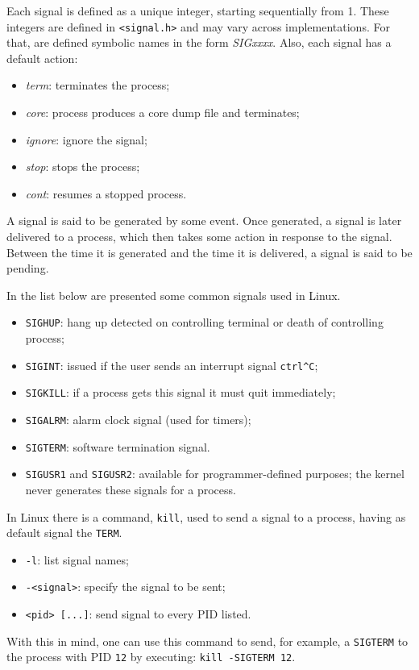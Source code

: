 Each signal is defined as a unique integer, starting sequentially from 1. These integers are defined in \verb|<signal.h>| and may vary across implementations. For that, are defined symbolic names in the form \textit{SIGxxxx}. Also, each signal has a default action:
\begin{itemize}
	\item \textit{term}: terminates the process;
	\item \textit{core}: process produces a core dump file and terminates;
	\item \textit{ignore}: ignore the signal;
	\item \textit{stop}: stops the process;
	\item \textit{cont}: resumes a stopped process.
\end{itemize}
A signal is said to be generated by some event. Once generated, a signal is later
delivered to a process, which then takes some action in response to the signal.
Between the time it is generated and the time it is delivered, a signal is said to be
pending.

In the list below are presented some common signals used in Linux.
\begin{itemize}
	\item \verb|SIGHUP|: hang up detected on controlling terminal or death of controlling process;
	\item \verb|SIGINT|: issued if the user sends an interrupt signal \verb|ctrl^C|;
	\item \verb|SIGKILL|: if a process gets this signal it must quit immediately;
	\item \verb|SIGALRM|: alarm clock signal (used for timers);
	\item \verb|SIGTERM|: software termination signal.
	\item \verb|SIGUSR1| and \verb|SIGUSR2|: available for programmer-defined purposes; the kernel never generates these signals for a process.
\end{itemize}


In Linux there is a command, \verb|kill|, used to send a signal to a process, having as default signal the \verb|TERM|.
\begin{itemize}
	\item \verb|-l|: list signal names;
	\item \verb|-<signal>|: specify the signal to be sent;
	\item \verb|<pid> [...]|: send signal to every PID listed.
\end{itemize}
With this in mind, one can use this command to send, for example, a \verb|SIGTERM| to the process with PID \verb|12| by executing: \verb|kill -SIGTERM 12|.

